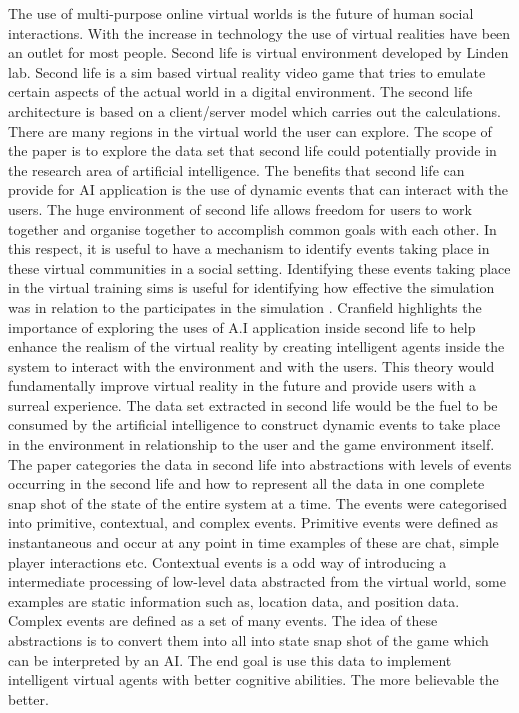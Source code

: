 \documentclass[12pt]{article} %
\begin{document}
The use of multi-purpose online virtual worlds is the future of human social interactions. With the increase in technology the use of virtual realities have been an outlet for most people. Second life is virtual environment developed by Linden lab. Second life is a sim based virtual reality video game that tries to emulate certain aspects of the actual world in a digital environment. The second life architecture is based on a client/server model which carries out the calculations. There are many regions in the virtual world the user can explore. The scope of the paper is to explore the data set that second life could potentially provide in the research area of artificial intelligence. The benefits that second life can provide for AI application is the use of dynamic events that can interact with the users. The huge environment of second life allows freedom for users to work together and organise together to accomplish common goals with each other. In this respect, it is useful to have a mechanism to identify events taking place in these virtual communities in a social setting. Identifying these events taking place in the virtual training sims is useful for identifying how effective the simulation was in relation to the participates in the simulation \cite{Cranfield}. Cranfield highlights the importance of exploring the uses of A.I application inside second life to help enhance the realism of the virtual reality by creating intelligent agents inside the system to interact with the environment and with the users. This theory would fundamentally improve virtual reality in the future and provide users with a surreal experience. The data set extracted in second life would be the fuel to be consumed by the artificial intelligence to construct dynamic events to take place in the environment in relationship to the user and the game environment itself. The paper categories the data in second life into abstractions with levels of events occurring in the second life and how to represent all the data in one complete snap shot of the state of the entire system at a time. The events were categorised into primitive, contextual, and complex events. Primitive events were defined as instantaneous and occur at any point in time examples of these are chat, simple player interactions etc. Contextual events is a odd way of introducing a intermediate processing of low-level data abstracted from the virtual world, some examples are static information such as, location data, and position data. Complex events are defined as a set of many events. The idea of these abstractions is to convert them into all into state snap shot of the game which can be interpreted by an AI. The end goal is use this data to implement intelligent virtual agents  with better cognitive abilities. The more believable the better. 
\end{document}
